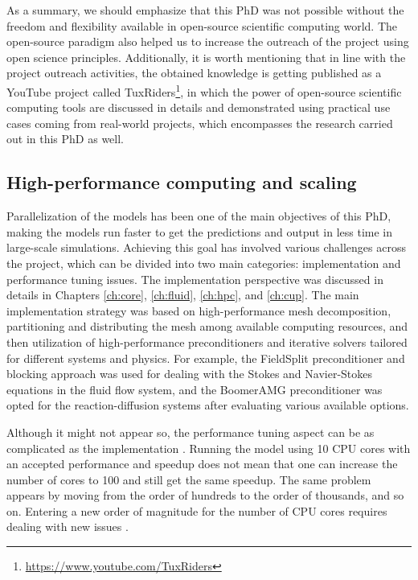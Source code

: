 As a summary, we should emphasize that this PhD was not possible without the freedom and flexibility available in open-source scientific computing world. The open-source paradigm also helped us to increase the outreach of the project using open science principles. Additionally, it is worth mentioning that in line with the project outreach activities, the obtained knowledge is getting published as a YouTube project called TuxRiders\footnote{\url{https://www.youtube.com/TuxRiders}}, in which the power of open-source scientific computing tools are discussed in details and demonstrated using practical use cases coming from real-world projects, which encompasses the research carried out in this PhD as well.


\subsection{High-performance computing and scaling} \label{sec:conclusion_hpc}

Parallelization of the models has been one of the main objectives of this PhD, making the models run faster to get the predictions and output in less time in large-scale simulations. Achieving this goal has involved various challenges across the project, which can be divided into two main categories: implementation and performance tuning issues. The implementation perspective was discussed in details in Chapters \ref{ch:core}, \ref{ch:fluid}, \ref{ch:hpc}, and \ref{ch:cup}. The main implementation strategy was based on high-performance mesh decomposition, partitioning and distributing the mesh among available computing resources, and then utilization of high-performance preconditioners and iterative solvers tailored for different systems and physics. For example, the FieldSplit preconditioner and blocking approach was used for dealing with the Stokes and Navier-Stokes equations in the fluid flow system, and the BoomerAMG preconditioner was opted for the reaction-diffusion systems after evaluating various available options.

Although it might not appear so, the performance tuning aspect can be as complicated as the implementation \cite{Mikailov2019,Bailey2010}. Running the model using 10 \gls{CPU} cores with an accepted performance and speedup does not mean that one can increase the number of cores to 100 and still get the same speedup. The same problem appears by moving from the order of hundreds to the order of thousands, and so on. Entering a new order of magnitude for the number of \gls{CPU} cores requires dealing with new issues \cite{Hager2011,Goedecker2001,Wadleigh2000}.

